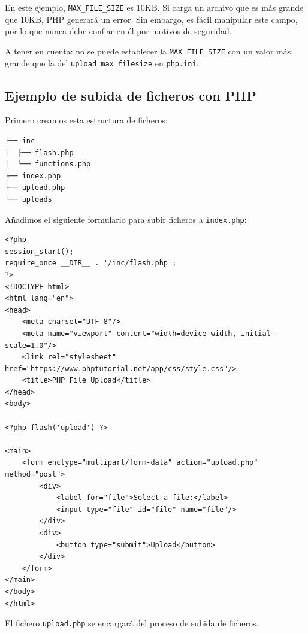 \documentclass[11pt]{article}
\begin{document}
En este ejemplo, \texttt{MAX\_FILE\_SIZE} es 10KB. Si carga un archivo que es
más grande que 10KB, PHP generará un error. Sin embargo, es fácil
manipular este campo, por lo que nunca debe confiar en él por motivos
de seguridad.

\begin{mdframed}
A tener en cuenta: no se puede establecer la \texttt{MAX\_FILE\_SIZE} con un valor más
grande que la del \texttt{upload\_max\_filesize} en \texttt{php.ini}.
\end{mdframed}

\subsection{Ejemplo de subida de ficheros con PHP}
\label{sec:org1c2d9f5}
Primero creamos esta estructura de ficheros:
\begin{verbatim}
├── inc
|  ├── flash.php
|  └── functions.php
├── index.php
├── upload.php
└── uploads
\end{verbatim}

Añadimos el siguiente formulario para subir ficheros a \texttt{index.php}:
\begin{verbatim}
<?php
session_start();
require_once __DIR__ . '/inc/flash.php';
?>
<!DOCTYPE html>
<html lang="en">
<head>
    <meta charset="UTF-8"/>
    <meta name="viewport" content="width=device-width, initial-scale=1.0"/>
    <link rel="stylesheet" href="https://www.phptutorial.net/app/css/style.css"/>
    <title>PHP File Upload</title>
</head>
<body>

<?php flash('upload') ?>

<main>
    <form enctype="multipart/form-data" action="upload.php" method="post">
        <div>
            <label for="file">Select a file:</label>
            <input type="file" id="file" name="file"/>
        </div>
        <div>
            <button type="submit">Upload</button>
        </div>
    </form>
</main>
</body>
</html>
\end{verbatim}

El fichero \texttt{upload.php} se encargará del proceso de subida de ficheros.
\end{document}

